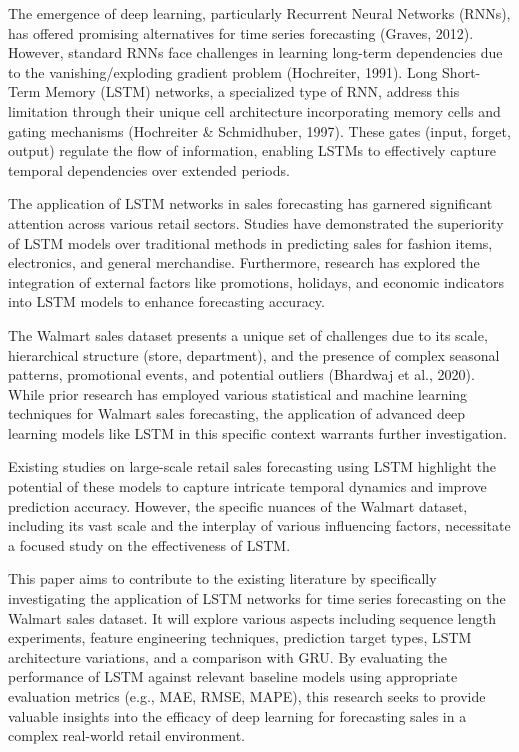 \documentclass[conference]{IEEEtran}
\begin{document}
The emergence of deep learning, particularly Recurrent Neural Networks (RNNs), has offered promising alternatives for time series forecasting (Graves, 2012). However, standard RNNs face challenges in learning long-term dependencies due to the vanishing/exploding gradient problem (Hochreiter, 1991). Long Short-Term Memory (LSTM) networks, a specialized type of RNN, address this limitation through their unique cell architecture incorporating memory cells and gating mechanisms (Hochreiter \& Schmidhuber, 1997). These gates (input, forget, output) regulate the flow of information, enabling LSTMs to effectively capture temporal dependencies over extended periods.

The application of LSTM networks in sales forecasting has garnered significant attention across various retail sectors. Studies have demonstrated the superiority of LSTM models over traditional methods in predicting sales for fashion items, electronics, and general merchandise. Furthermore, research has explored the integration of external factors like promotions, holidays, and economic indicators into LSTM models to enhance forecasting accuracy.

The Walmart sales dataset presents a unique set of challenges due to its scale, hierarchical structure (store, department), and the presence of complex seasonal patterns, promotional events, and potential outliers (Bhardwaj et al., 2020). While prior research has employed various statistical and machine learning techniques for Walmart sales forecasting, the application of advanced deep learning models like LSTM in this specific context warrants further investigation.

Existing studies on large-scale retail sales forecasting using LSTM highlight the potential of these models to capture intricate temporal dynamics and improve prediction accuracy. However, the specific nuances of the Walmart dataset, including its vast scale and the interplay of various influencing factors, necessitate a focused study on the effectiveness of LSTM.

This paper aims to contribute to the existing literature by specifically investigating the application of LSTM networks for time series forecasting on the Walmart sales dataset. It will explore various aspects including sequence length experiments, feature engineering techniques, prediction target types, LSTM architecture variations, and a comparison with GRU. By evaluating the performance of LSTM against relevant baseline models using appropriate evaluation metrics (e.g., MAE, RMSE, MAPE), this research seeks to provide valuable insights into the efficacy of deep learning for forecasting sales in a complex real-world retail environment.
\end{document}

